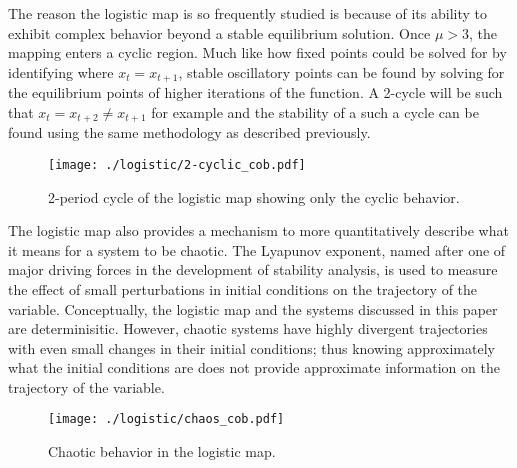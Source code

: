 The reason the logistic map is so frequently studied is because of its ability to exhibit complex behavior beyond a stable equilibrium solution. Once $\mu>3$, the mapping enters a cyclic region. Much like how fixed points could be solved for by identifying where $x_{t}=x_{t+1}$, stable oscillatory points can be found by solving for the equilibrium points of higher iterations of the function. A 2-cycle will be such that $x_{t}=x_{t+2}\neq x_{t+1}$ for example and the stability of a such a cycle can be found using the same methodology as described previously. 
\begin{figure}
    \centering
    \texttt{[image: ./logistic/2-cyclic\_cob.pdf]}
    \caption{2-period cycle of the logistic map showing only the cyclic behavior.}
    \label{log_cyclic_cob}
\end{figure}
The logistic map also provides a mechanism to more quantitatively describe what it means for a system to be chaotic. The Lyapunov exponent, named after one of major driving forces in the development of stability analysis, is used to measure the effect of small perturbations in initial conditions on the trajectory of the variable\autocite{Puu2003}. Conceptually, the logistic map and the systems discussed in this paper are determinisitic. However, chaotic systems have highly divergent trajectories with even small changes in their initial conditions; thus knowing approximately what the initial conditions are does not provide approximate information on the trajectory of the variable. 
\begin{figure}
    \centering
    \texttt{[image: ./logistic/chaos\_cob.pdf]}
    \caption{Chaotic behavior in the logistic map.}
    \label{log_chaos_cob}
\end{figure}

